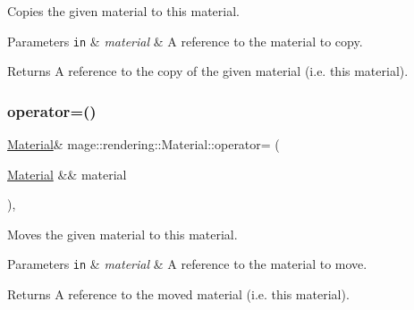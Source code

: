 Copies the given material to this material.


\begin{DoxyParams}[1]{Parameters}
\mbox{\tt in}  & {\em material} & A reference to the material to copy. \\
\hline
\end{DoxyParams}
\begin{DoxyReturn}{Returns}
A reference to the copy of the given material (i.\+e. this material). 
\end{DoxyReturn}
\hypertarget{classmage_1_1rendering_1_1_material_a2f90e0eeb8283da70db48fc1618aed10}{}\label{classmage_1_1rendering_1_1_material_a2f90e0eeb8283da70db48fc1618aed10} 
\subsubsection{\texorpdfstring{operator=()}{operator=()}\hspace{0.1cm}{\footnotesize\ttfamily [2/2]}}
{\footnotesize\ttfamily \hyperlink{classmage_1_1rendering_1_1_material}{Material}\& mage\+::rendering\+::\+Material\+::operator= (\begin{DoxyParamCaption}\item[{\hyperlink{classmage_1_1rendering_1_1_material}{Material} \&\&}]{material }\end{DoxyParamCaption})\hspace{0.3cm}{\ttfamily [default]}, {\ttfamily [noexcept]}}

Moves the given material to this material.


\begin{DoxyParams}[1]{Parameters}
\mbox{\tt in}  & {\em material} & A reference to the material to move. \\
\hline
\end{DoxyParams}
\begin{DoxyReturn}{Returns}
A reference to the moved material (i.\+e. this material). 
\end{DoxyReturn}
\hypertarget{classmage_1_1rendering_1_1_material_aae6ebdb492e06a39e1f420154962ab0f}{}\label{classmage_1_1rendering_1_1_material_aae6ebdb492e06a39e1f420154962ab0f} 
